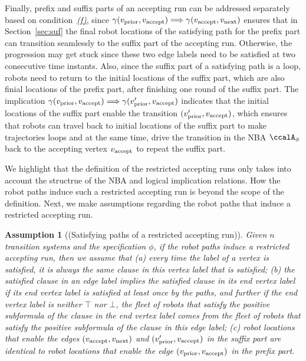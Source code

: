 \documentclass[Afour,sageh,times]{sagej}
\newtheorem{asmp}[thm]{Assumption}
\newcommand{\autop}{\ccalA_{\phi}}
\newcommand{\vertex}[1]{v_{\textup{#1}}}
\newcommand{\simplies}{\DOTSB\Longrightarrow}
\begin{document}
      Finally, prefix and suffix parts of an accepting run can be addressed separately based on condition~\hyperref[cond:f]{\it (f)}, since  $\gamma(\vertex{prior}, \vertex{accept}) \simplies  \gamma(\vertex{accept}, \vertex{next})$  ensures that in Section~\ref{sec:suf} the final robot locations of the satisfying path for  the prefix part can transition seamlessly to the suffix part of the accepting run. Otherwise, the progression may get stuck since these two edge labels need to be satisfied at two consecutive time instants. Also, since the suffix part of a satisfying path is a loop, robots need to return to the initial locations of the suffix part, which are also  finial locations of the prefix part, after finishing one round of the suffix part. The implication $\gamma(\vertex{prior}, \vertex{accept}) \simplies  \gamma(\vertex{prior}', \vertex{accept})$ indicates that the initial locations of the suffix part enable the transition  $(\vertex{prior}', \vertex{accept})$, which ensures that robots can travel back to initial locations of the suffix part  to make trajectories loops and at the same time, drive the transition in the NBA $\autop$ back to the accepting vertex $\vertex{accept}$ to repeat the suffix part.



We highlight that the definition of the restricted  accepting runs only takes into account the structrue of the  NBA and logical implication relations. How the robot paths induce such a restricted accepting run  is beyond the scope of the definition. Next, we make assumptions regarding the robot paths that induce a restricted accepting run.
\begin{asmp}[(Satisfying paths of a restricted accepting run)]\label{asmp:same}
  Given $n$ transition systems and the specification $\phi$, if the robot paths induce a restricted accepting run, then we assume that
  (a)\label{asmp:a} every time the label of a vertex is satisfied, it is always the same clause in this vertex label that is satisfied; (b)\label{asmp:b} the satisfied clause in an edge label implies the satisfied clause in its end vertex label if its end vertex label is satisfied at least once by the paths, and further if the end vertex label is neither $\top$ nor $\bot$, %
  the fleet of robots that satisfy the positive subformula of the clause in the end vertex label comes from the fleet of robots that satisfy the positive   subformula of the clause in this edge label;
 (c)\label{asmp:c} robot locations that enable the edges $(\vertex{accept}, \vertex{next})$ and  $(\vertex{prior}', \vertex{accept})$ in the suffix part are identical to robot locations that enable the edge $(\vertex{prior}, \vertex{accept})$ in the prefix part.
\end{asmp}
\end{document}
